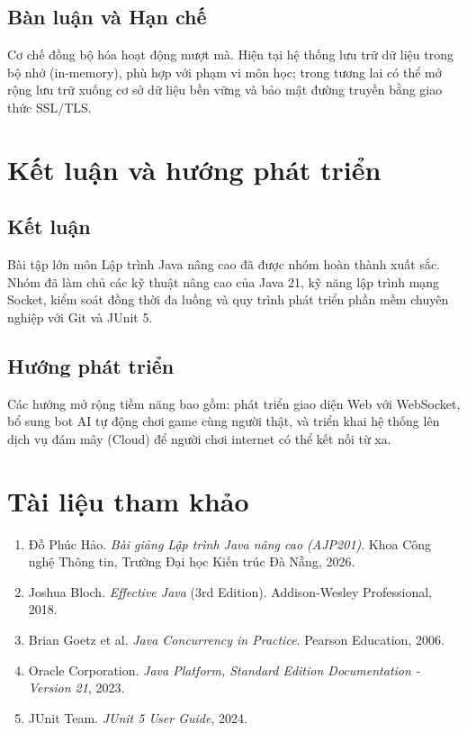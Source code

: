 \documentclass[12pt,a4paper,oneside]{report}
\begin{document}
\section{Bàn luận và Hạn chế}
Cơ chế đồng bộ hóa hoạt động mượt mà. Hiện tại hệ thống lưu trữ dữ liệu trong bộ nhớ (in-memory), phù hợp với phạm vi môn học; trong tương lai có thể mở rộng lưu trữ xuống cơ sở dữ liệu bền vững và bảo mật đường truyền bằng giao thức SSL/TLS.

\chapter{Kết luận và hướng phát triển}

\section{Kết luận}
Bài tập lớn môn Lập trình Java nâng cao đã được nhóm hoàn thành xuất sắc. Nhóm đã làm chủ các kỹ thuật nâng cao của Java 21, kỹ năng lập trình mạng Socket, kiểm soát đồng thời đa luồng và quy trình phát triển phần mềm chuyên nghiệp với Git và JUnit 5.

\section{Hướng phát triển}
Các hướng mở rộng tiềm năng bao gồm: phát triển giao diện Web với WebSocket, bổ sung bot AI tự động chơi game cùng người thật, và triển khai hệ thống lên dịch vụ đám mây (Cloud) để người chơi internet có thể kết nối từ xa.

\chapter*{Tài liệu tham khảo}
\begin{enumerate}
  \item Đỗ Phúc Hảo. \textit{Bài giảng Lập trình Java nâng cao (AJP201)}. Khoa Công nghệ Thông tin, Trường Đại học Kiến trúc Đà Nẵng, 2026.
  \item Joshua Bloch. \textit{Effective Java} (3rd Edition). Addison-Wesley Professional, 2018.
  \item Brian Goetz et al. \textit{Java Concurrency in Practice}. Pearson Education, 2006.
  \item Oracle Corporation. \textit{Java Platform, Standard Edition Documentation - Version 21}, 2023.
  \item JUnit Team. \textit{JUnit 5 User Guide}, 2024.
\end{enumerate}
\end{document}
